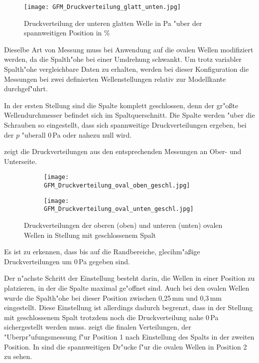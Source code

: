 \begin{figure}[h]
	\centering
	\texttt{[image: GFM\_Druckverteilung\_glatt\_unten.jpg]}
	\caption{Druckverteilung der unteren glatten Welle in Pa "uber der spannweitigen Position in \%}
	\label{fig:Druckverteilung_glatt_unten}
\end{figure}

Dieselbe Art von Messung muss bei Anwendung auf die ovalen Wellen modifiziert werden, da die Spalth"ohe bei einer Umdrehung schwankt.
Um trotz variabler Spalth"ohe vergleichbare Daten zu erhalten, werden bei dieser Konfiguration die Messungen bei zwei definierten Wellenstellungen relativ zur Modellkante durchgef"uhrt.

In der ersten Stellung sind die Spalte komplett geschlossen, denn der gr"o\ss{}te Wellendurchmesser befindet sich im Spaltquerschnitt.
Die Spalte werden "uber die Schrauben so eingestellt, dass sich spannweitige Druckverteilungen ergeben, bei der $p$ "uberall 0\,Pa oder nahezu null wird.

 zeigt die Druckverteilungen aus den entsprechenden Messungen an Ober- und Unterseite.

\begin{figure}[h]
	\centering
	\begin{subfigure}[c]{0.85\textwidth}		
		\texttt{[image: GFM\_Druckverteilung\_oval\_oben\_geschl.jpg]}
	\end{subfigure}
	\begin{subfigure}[c]{0.85\textwidth}
		\texttt{[image: GFM\_Druckverteilung\_oval\_unten\_geschl.jpg]}
	\end{subfigure}
	\caption{Druckverteilungen der oberen (oben) und unteren (unten) ovalen Wellen in Stellung mit geschlossenem Spalt}
	\label{fig:Druckverteilung_oval_geschl}
\end{figure}

Es ist zu erkennen, dass bis auf die Randbereiche, glecihm"a\ss{}ige Druckverteilungen um 0\,Pa gegeben sind.

Der n"achste Schritt der Einstellung besteht darin, die Wellen in einer Position zu platzieren, in der die Spalte maximal ge"offnet sind. Auch bei den ovalen Wellen wurde die Spalth"ohe bei dieser Position zwischen 0,25\,mm und 0,3\,mm eingestellt. Diese Einstellung ist allerdings dadurch begrenzt, dass in der Stellung mit geschlossenem Spalt trotzdem noch die Druckverteilung nahe 0\,Pa sichergestellt werden muss.  zeigt die finalen Verteilungen, der "Uberpr"ufungsmessung f"ur Position 1 nach Einstellung des Spalts in der zweiten Position.  
In  sind die spannweitigen Dr"ucke f"ur die ovalen Wellen in Position 2 zu sehen.

